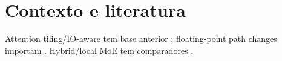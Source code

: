 \section{Contexto e literatura}
Attention tiling/IO-aware tem base anterior \cite{dao2022flashattention}; floating-point path changes importam \cite{goldberg1991floating}. Hybrid/local MoE tem comparadores \cite{chen2025ktransformers,wang2026localslo}.

